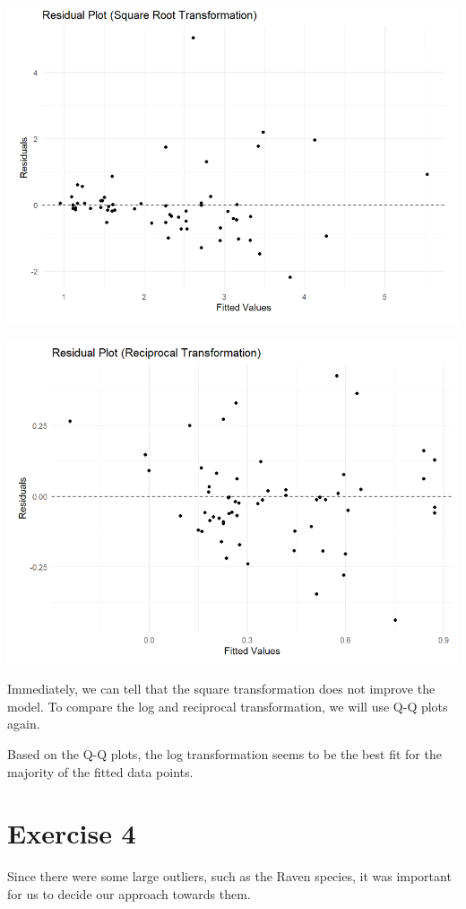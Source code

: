 \documentclass{article}
\begin{document}
\begin{center}
\includegraphics[scale=0.5]{graphs/graph-sqrt.png}
\end{center}

\begin{center}
\includegraphics[scale=0.5]{graphs/graph-over.png}
\end{center}

Immediately, we can tell that the square transformation does not improve the model. To compare the log and reciprocal transformation, we will use Q-Q plots again.

Based on the Q-Q plots, the log transformation seems to be the best fit for the majority of the fitted data points.

\section{Exercise 4}
Since there were some large outliers, such as the Raven species, it was important for us to decide our approach towards them.
\end{document}

